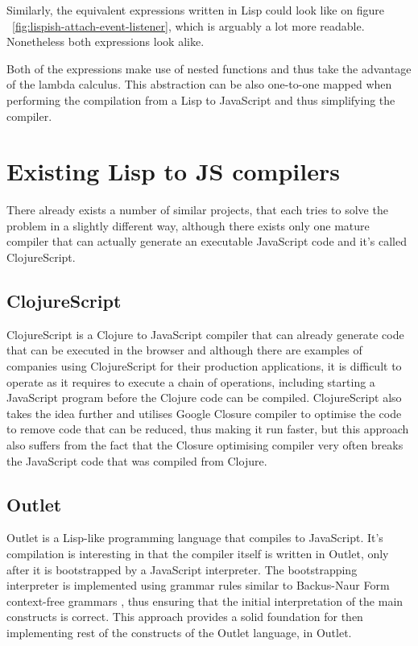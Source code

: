 Similarly, the equivalent expressions written in Lisp could look like on figure ~\ref{fig:lispish-attach-event-listener}, which is arguably a lot more readable. Nonetheless both expressions look alike. 

Both of the expressions make use of nested functions and thus take the advantage of the lambda calculus. This abstraction can be also one-to-one mapped when performing the compilation from a Lisp to JavaScript and thus simplifying the compiler.

\section{Existing Lisp to JS compilers}
There already exists a number of similar projects, that each tries to solve the problem in a slightly different way, although there exists only one mature compiler that can actually generate an executable JavaScript code and it's called ClojureScript.

\subsection{ClojureScript}
ClojureScript is a Clojure to JavaScript compiler that can already generate code that can be executed in the browser and although there are examples of companies using ClojureScript for their production applications, it is difficult to operate as it requires to execute a chain of operations, including starting a JavaScript program before the Clojure code can be compiled.
ClojureScript also takes the idea further and utilises Google Closure compiler to optimise the code to remove code that can be reduced, thus making it run faster, but this approach also suffers from the fact that the Closure optimising compiler very often breaks the JavaScript code that was compiled from Clojure.

\subsection{Outlet}
Outlet\cite{Outlet:2013:Site} is a Lisp-like programming language that compiles to JavaScript. 
It's compilation is interesting in that the compiler itself is written in Outlet, only after it is bootstrapped by a JavaScript interpreter.
The bootstrapping interpreter is implemented using grammar rules similar to Backus-Naur Form context-free grammars \cite{RecursiveDescentParserJS:2013:Site} , thus ensuring that the initial interpretation of the main constructs is correct. 
This approach provides a solid foundation for then implementing rest of the constructs of the Outlet language, in Outlet.

